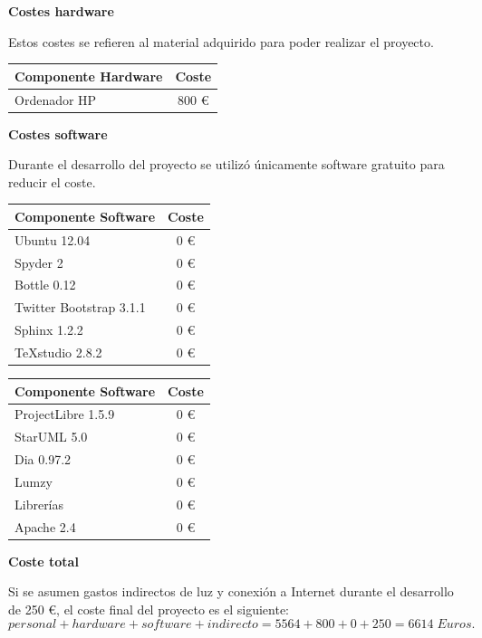 \noindent
\textbf{Costes hardware}

Estos costes se refieren al material adquirido para poder realizar el proyecto.

\begin{table}[H]
	\centering
	\begin{tabular}{|l|c|}
		\hline
		\textbf{Componente Hardware} & \textbf{Coste} \\ \hline
		Ordenador HP & 800 \euro \\ \hline
	\end{tabular}
\end{table}

\noindent
\textbf{Costes software}

Durante el desarrollo del proyecto se utilizó únicamente software gratuito para reducir el coste.

\begin{table}[H]
	\centering
	\begin{tabular}{|l|c|}
		\hline
		\textbf{Componente Software} & \textbf{Coste} \\ \hline
		Ubuntu 12.04 & 0 \euro \\ \hline
		Spyder 2 & 0 \euro \\ \hline
		Bottle 0.12 & 0 \euro \\ \hline
		Twitter Bootstrap 3.1.1 & 0 \euro \\ \hline
		Sphinx 1.2.2 & 0 \euro \\ \hline
		TeXstudio 2.8.2 & 0 \euro \\ \hline
	\end{tabular}
	\quad
	\begin{tabular}{|l|c|}
		\hline
		\textbf{Componente Software} & \textbf{Coste} \\ \hline
		ProjectLibre 1.5.9 & 0 \euro \\ \hline
		StarUML 5.0 & 0 \euro \\ \hline
		Dia 0.97.2 & 0 \euro \\ \hline
		Lumzy & 0 \euro \\ \hline
		Librerías & 0 \euro \\ \hline
		Apache 2.4 & 0 \euro \\ \hline
	\end{tabular}
\end{table}

\noindent
\textbf{Coste total}

Si se asumen gastos indirectos de luz y conexión a Internet durante el desarrollo de 250 \euro, el coste final  del proyecto es el siguiente:
\[ personal + hardware + software + indirecto = 5564 + 800 + 0 + 250 = 6614 \; Euros. \]